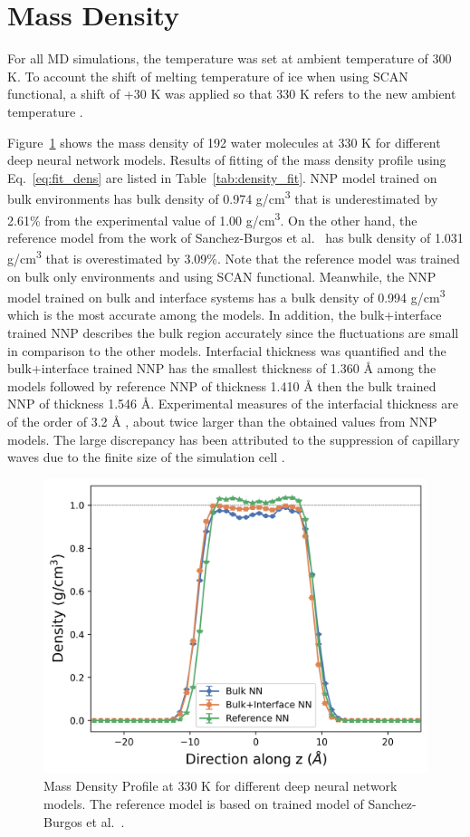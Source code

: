 \section{Mass Density}
For all MD simulations, the temperature was set at ambient temperature of 300
K. To account the shift of melting temperature of ice when using SCAN
functional,
a shift of +30 K was applied so that 330 K refers to the new ambient
temperature \cite{piaggi2021phase}.

Figure~\ref{fig:density} shows the mass density of 192 water molecules at 330 K
for different deep neural network models. Results of fitting of the mass density profile using Eq.~\ref{eq:fit_dens} are listed in Table~\ref{tab:density_fit}. NNP model trained on bulk
environments has bulk
density of 0.974 \unit{
	g/cm^3} that is underestimated by 2.61\% from the experimental value of 1.00 \unit{
	g/cm^3}. On the other hand, the reference model from the work of
Sanchez-Burgos et
al.~\cite{sanchez2023deep} has bulk density of 1.031 \unit{
	g/cm^3} that is overestimated by 3.09\%. Note that the
reference model was trained on bulk only environments and using SCAN
functional. Meanwhile,
the NNP model trained on  bulk and interface systems has a bulk density of  0.994 \unit{
	g/cm^3} which is the most accurate among the models. In addition, the bulk+interface trained NNP  describes	the bulk region accurately since the fluctuations are small in
comparison to the other models. Interfacial thickness was quantified
and the bulk+interface trained NNP has the smallest thickness of 1.360 \unit{\angstrom} among the models followed by reference NNP of thickness 1.410  \unit{\angstrom} then the bulk trained NNP of thickness 1.546  \unit{\angstrom}. Experimental measures of the interfacial thickness are of the order of 3.2 \unit{\angstrom} \cite{braslau1985surface}, about twice larger than the obtained values from NNP models. The large discrepancy has been
attributed to the suppression of capillary waves due to the finite size of  the simulation cell \cite{matsumoto1988study}.




\begin{figure}[tbhp!]
	\centering
	\includegraphics[width=0.65\linewidth]{images/density_330.png}
	\caption{Mass Density Profile at 330 K for different deep neural
		network
		models. The reference model is based on trained model of
		Sanchez-Burgos et
		al.~\cite{sanchez2023deep}. }
	\label{fig:density}
\end{figure}


